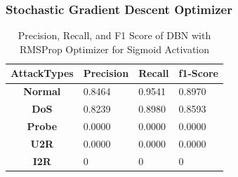 \documentclass[12pt, a4paper]{report}
\begin{document}
\subsubsection{Stochastic Gradient Descent Optimizer}
\begin{table}[ht]
\centering
\captionsetup{justification=centering,margin=2cm}
\begin{tabular}{|c|l|l|l|}
\hline
\textbf{AttackTypes} & \multicolumn{1}{c|}{\textbf{Precision}} & \multicolumn{1}{c|}{\textbf{Recall}} & \multicolumn{1}{c|}{\textbf{f1-Score}} \\ \hline
\textbf{Normal}      & 0.8464                                  & 0.9541                               & 0.8970                                 \\ \hline
\textbf{DoS}         & 0.8239                                  & 0.8980                               & 0.8593                                 \\ \hline
\textbf{Probe}       & 0.0000                                  & 0.0000                               & 0.0000                                 \\ \hline
\textbf{U2R}         & 0.0000                                  & 0.0000                               & 0.0000                                 \\ \hline
\textbf{I2R}         & 0                                       & 0                                    & 0                                      \\ \hline
\end{tabular}
\caption{Precision, Recall, and F1 Score of DBN with RMSProp Optimizer for Sigmoid Activation}
\label{prf1_sgd_dbn}
\end{table}
\end{document}
